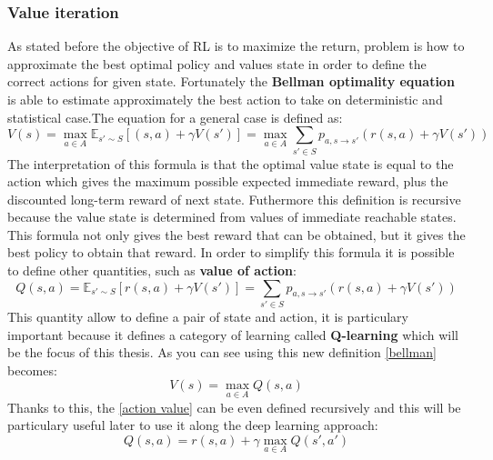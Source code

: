 \subsubsection{Value iteration}
As stated before the objective of RL is to maximize the return, problem is how to approximate the best optimal policy and values state in order to define the correct actions for given state. Fortunately the \textbf{Bellman optimality equation} is able to estimate approximately the best action to take on deterministic and statistical case.The equation for a general case is defined as:
\begin{equation}\label{bellman}
	V(s) = \max_{a \in A} \mathbb{E}_{s' \sim S}[(s,a) + \gamma V(s')] = \max_{a \in A} \sum_{s' \in S} p_{a, s \to s'}(r(s,a) + \gamma V(s'))
\end{equation}
The interpretation of this formula is that the optimal value state is equal to the action which gives the maximum possible expected immediate reward, plus the discounted long-term reward of next state. Futhermore this definition is recursive because the value state is determined from values of immediate reachable states. This formula not only gives the best reward that can be obtained, but it gives the best policy to obtain that reward.
In order to simplify this formula it is possible to define other quantities, such as \textbf{value of action}:
\begin{equation}\label{action value}
	Q(s,a) = \mathbb{E}_{s' \sim S}[r(s,a)+ \gamma V(s')] = \sum_{s' \in S} p_{a, s \to s'}(r(s,a) + \gamma V(s'))
\end{equation}
This quantity allow to define a pair of state and action, it is particulary important because it defines a category of learning called \textbf{Q-learning} which will be the focus of this thesis. As you can see using this new definition \ref{bellman} becomes:
\begin{equation*}
	V(s) = \max_{a \in A} Q(s,a)
\end{equation*}
Thanks to this, the \ref{action value} can be even defined recursively and this will be particulary useful later to use it along the deep learning approach:
\begin{equation}\label{recursive}
	Q(s,a) = r(s,a) + \gamma \max_{a \in A} Q(s',a')
\end{equation} 
